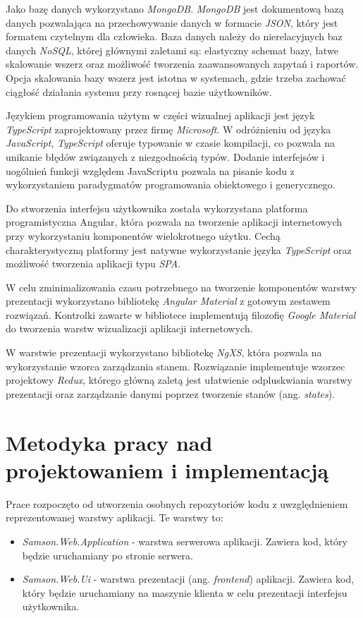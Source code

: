 \documentclass[a4paper,twoside,12pt]{book}
\newcommand{\obcy}[1]{\emph{#1}}
\newcommand{\ang}[1]{{\selectlanguage{british}\obcy{#1}}}
\begin{document}
	Jako bazę danych wykorzystano \textit{MongoDB}. \textit{MongoDB} jest dokumentową bazą danych pozwalająca na przechowywanie danych w formacie \textit{JSON}, który jest formatem czytelnym dla człowieka. Baza danych należy do nierelacyjnych baz danych \textit{NoSQL}, której głównymi zaletami są: elastyczny schemat bazy, łatwe skalowanie wszerz oraz możliwość tworzenia zaawansowanych zapytań i raportów\cite{bib:mongodb_guide}. Opcja skalowania bazy wszerz jest istotna w systemach, gdzie trzeba zachować ciągłość działania systemu przy rosnącej bazie użytkowników.
	
	Językiem programowania użytym w części wizualnej aplikacji jest język \textit{TypeScript} zaprojektowany przez firmę \textit{Microsoft}. W odróżnieniu od języka \textit{JavaScript}, \textit{TypeScript} oferuje typowanie w czasie kompilacji, co pozwala na unikanie błędów związanych z niezgodnością typów. Dodanie interfejsów i uogólnień funkcji względem JavaScriptu pozwala na pisanie kodu z wykorzystaniem paradygmatów programowania obiektowego i generycznego\cite{bib:typescript}.
	
	Do stworzenia interfejsu użytkownika została wykorzystana platforma programistyczna Angular, która pozwala na tworzenie aplikacji internetowych przy wykorzystaniu komponentów wielokrotnego użytku. Cechą charakterystyczną platformy jest natywne wykorzystanie języka \textit{TypeScript} oraz możliwość tworzenia aplikacji typu \textit{SPA}\cite{bib:anuglar}\cite{bib:typescript}.
	
	W celu zminimalizowania czasu potrzebnego na tworzenie komponentów warstwy prezentacji wykorzystano bibliotekę \textit{Angular Material} z gotowym zestawem rozwiązań. Kontrolki zawarte w bibliotece implementują filozofię \textit{Google Material} do tworzenia warstw wizualizacji aplikacji internetowych.
	
	W warstwie prezentacji wykorzystano bibliotekę \textit{NgXS}, która pozwala na wykorzystanie wzorca zarządzania stanem. Rozwiązanie implementuje wzorzec projektowy \textit{Redux}, którego główną zaletą jest ułatwienie odpluskwiania warstwy prezentacji oraz zarządzanie danymi poprzez tworzenie stanów (ang. \ang{states}).
	
	\section {Metodyka pracy nad projektowaniem i implementacją}
	
	Prace rozpoczęto od utworzenia osobnych repozytoriów kodu z uwzględnieniem reprezentowanej warstwy aplikacji. Te warstwy to:
	\begin{itemize}
		\item \textit{Samson.Web.Application} - warstwa serwerowa aplikacji. Zawiera kod, który będzie uruchamiany po stronie serwera.
		\item \textit{Samson.Web.Ui} - warstwa prezentacji (ang. \ang{frontend}) aplikacji. Zawiera kod, który będzie uruchamiany na maszynie klienta w celu prezentacji interfejsu użytkownika.
	\end{itemize}
\end{document}

